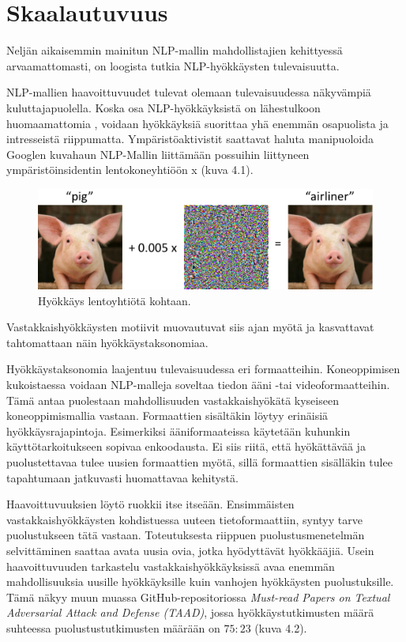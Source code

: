 \chapter{Skaalautuvuus\label{discussion}}
Neljän aikaisemmin mainitun NLP-mallin mahdollistajien kehittyessä arvaamattomasti, on loogista tutkia NLP-hyökkäysten tulevaisuutta. 

NLP-mallien haavoittuvuudet tulevat olemaan tulevaisuudessa näkyvämpiä kuluttajapuolella. Koska osa NLP-hyökkäyksistä on lähestulkoon huomaamattomia \citep{triggerless}, voidaan hyökkäyksiä suorittaa yhä enemmän osapuolista ja intresseistä riippumatta. Ympäristöaktivistit saattavat haluta manipuoloida Googlen kuvahaun NLP-Mallin liittämään possuihin liittyneen ympäristöinsidentin lentokoneyhtiöön x (kuva 4.1).
\begin{figure}[ht]
  \includegraphics[scale=0.4]{figures/piggie.png}
  \caption{Hyökkäys lentoyhtiötä kohtaan. \citep{adversexamples}}
\end{figure}

Vastakkaishyökkäysten motiivit muovautuvat siis ajan myötä ja kasvattavat tahtomattaan näin hyökkäystaksonomiaa. 

Hyökkäystaksonomia laajentuu tulevaisuudessa eri formaatteihin. Koneoppimisen kukoistaessa voidaan NLP-malleja soveltaa tiedon ääni -tai videoformaatteihin. Tämä antaa puolestaan mahdollisuuden vastakkaishyökätä kyseiseen koneoppimismallia vastaan. Formaattien sisältäkin löytyy erinäisiä hyökkäysrajapintoja. Esimerkiksi ääniformaateissa käytetään kuhunkin käyttötarkoitukseen sopivaa enkoodausta. Ei siis riitä, että hyökättävää ja puolustettavaa tulee uusien formaattien myötä, sillä formaattien sisälläkin tulee tapahtumaan jatkuvasti huomattavaa kehitystä.

Haavoittuvuuksien löytö ruokkii itse itseään. Ensimmäisten vastakkaishyökkäysten kohdistuessa uuteen tietoformaattiin, syntyy tarve puolustukseen tätä vastaan. Toteutuksesta riippuen puolustusmenetelmän selvittäminen saattaa avata uusia ovia, jotka hyödyttävät hyökkääjiä. Usein haavoittuvuuden tarkastelu vastakkaishyökkäyksissä avaa enemmän mahdollisuuksia uusille hyökkäyksille kuin vanhojen hyökkäysten puolustuksille. Tämä näkyy muun muassa GitHub-repositoriossa \textit{Must-read Papers on Textual Adversarial Attack and Defense (TAAD)}, jossa hyökkäystutkimusten määrä suhteessa puolustustutkimusten määrään on $75:23$ (kuva 4.2).

